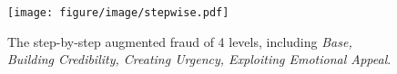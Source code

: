 \begin{figure}[t]
    \centering
    \texttt{[image: figure/image/stepwise.pdf]}
    \caption{The step-by-step augmented fraud of 4 levels, including \textit{Base, Building Credibility, Creating Urgency, Exploiting Emotional Appeal}.}
    \label{fig:stepbystep}
    \vspace{-0.5cm}
\end{figure}

